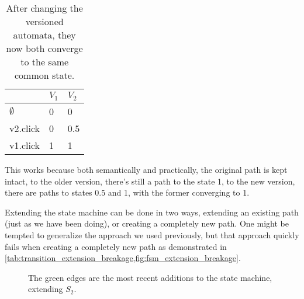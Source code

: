 \documentclass[a4paper]{article}
\begin{document}
\begin{table}[ht]
    \centering
    \begin{tabular}{l|l|l|}
        \cline{2-3}
                                          & $V_1$ & $V_2$ \\ \hline
        \multicolumn{1}{|l|}{$\emptyset$} & 0     & 0     \\ \hline
        \multicolumn{1}{|l|}{v2.click}    & 0     & 0.5   \\ \hline
        \multicolumn{1}{|l|}{v1.click}    & 1     & 1     \\ \hline
    \end{tabular}
    \caption{After changing the versioned automata, they now both converge to the same common state.}
    \label{tab:transition_convergence}
\end{table}

This works because both semantically and practically, the original path is kept intact,
to the older version, there's still a path to the state 1, to the new version, there are paths to
states 0.5 and 1, with the former converging to 1.

Extending the state machine can be done in two ways, extending an existing path (just as we have been doing),
or creating a completely new path. One might be tempted to generalize the approach we used previously,
but that approach quickly fails when creating a completely new path as demonstrated in \cref{tab:transition_extension_breakage,fig:fsm_extension_breakage}.

\begin{figure}[ht]
    \centering
    \caption{The green edges are the most recent additions to the state machine, extending $S_2$.}
    \label{fig:fsm_extension_breakage}
\end{figure}
\end{document}
